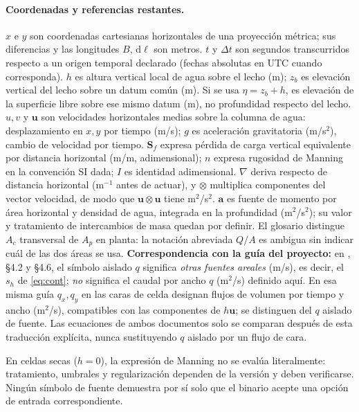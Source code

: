 \documentclass[11pt,a4paper]{article}
\begin{document}
\paragraph{Coordenadas y referencias restantes.} $x$ e $y$ son coordenadas cartesianas horizontales de una proyección métrica; sus diferencias y las longitudes $B$, $\mathrm d\ell$ son metros. $t$ y $\Delta t$ son segundos transcurridos respecto a un origen temporal declarado (fechas absolutas en UTC cuando corresponda). $h$ es altura vertical local de agua sobre el lecho (m); $z_b$ es elevación vertical del lecho sobre un datum común (m). Si se usa $\eta=z_b+h$, es elevación de la superficie libre sobre ese mismo datum (m), no profundidad respecto del lecho. $u,v$ y $\boldsymbol u$ son velocidades horizontales medias sobre la columna de agua: desplazamiento en $x,y$ por tiempo (m/s); $g$ es aceleración gravitatoria (m/s$^2$), cambio de velocidad por tiempo. $\boldsymbol S_f$ expresa pérdida de carga vertical equivalente por distancia horizontal (m/m, adimensional); $n$ expresa rugosidad de Manning en la convención SI dada; $I$ es identidad adimensional. $\nabla$ deriva respecto de distancia horizontal (m$^{-1}$ antes de actuar), y $\otimes$ multiplica componentes del vector velocidad, de modo que $\boldsymbol u\otimes\boldsymbol u$ tiene m$^2$/s$^2$. $\boldsymbol a$ es fuente de momento por área horizontal y densidad de agua, integrada en la profundidad (m$^2$/s$^2$); su valor y tratamiento de intercambios de masa quedan por definir. El glosario distingue $A_c$ transversal de $A_p$ en planta: la notación abreviada $Q/A$ es ambigua sin indicar cuál de las dos áreas se usa. \textbf{Correspondencia con la guía del proyecto:} en , §4.2 y §4.6, el símbolo aislado $q$ significa \emph{otras fuentes areales} (m/s), es decir, el $s_h$ de \eqref{eq:cont}; \emph{no} significa el caudal por ancho $q$ (m$^2$/s) definido aquí. En esa misma guía $q_x,q_y$ en las caras de celda designan flujos de volumen por tiempo y ancho (m$^2$/s), compatibles con las componentes de $h\boldsymbol u$; se distinguen del $q$ aislado de fuente. Las ecuaciones de ambos documentos solo se comparan después de esta traducción explícita, nunca sustituyendo $q$ aislado por un flujo de cara.

En celdas secas ($h=0$), la expresión de Manning no se evalúa literalmente: tratamiento, umbrales y regularización dependen de la versión y deben verificarse. Ningún símbolo de fuente demuestra por sí solo que el binario acepte una opción de entrada correspondiente.
\end{document}
